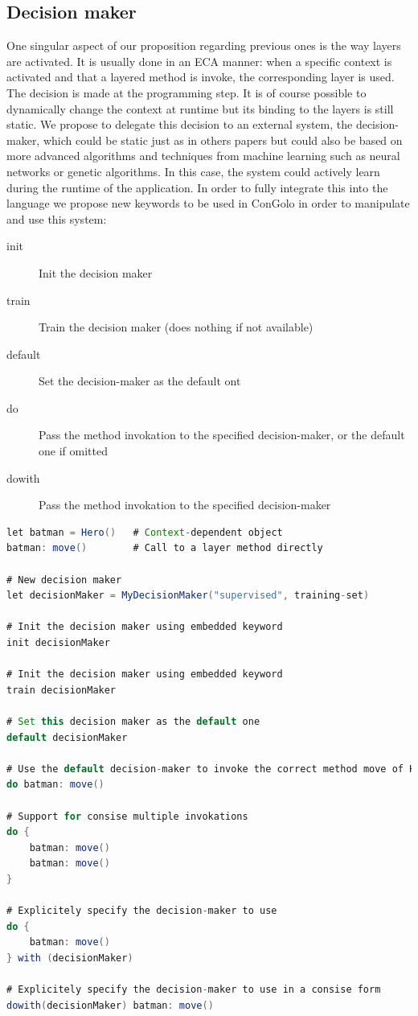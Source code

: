 \documentclass[a4paper]{article}
\begin{document}
\subsection{Decision maker}
\label{subsection:decisionmaker}

One singular aspect of our proposition regarding previous ones is the way layers are activated. It is usually done in an ECA manner: when a specific context is activated and that a layered method is invoke, the corresponding layer is used. The decision is made at the programming step. It is of course possible to dynamically change the context at runtime but its binding to the layers is still static. We propose to delegate this decision to an external system, the decision-maker, which could be static just as in others papers but could also be based on more advanced algorithms and techniques from machine learning such as neural networks or genetic algorithms. In this case, the system could actively learn during the runtime of the application. In order to fully integrate this into the language we propose new keywords to be used in ConGolo in order to manipulate and use this system:

\begin{description}
  \item[init] Init the decision maker
  \item[train] Train the decision maker (does nothing if not available)
  \item[default] Set the decision-maker as the default ont
  \item[do] Pass the method invokation to the specified decision-maker, or the default one if omitted
  \item[dowith] Pass the method invokation to the specified decision-maker
\end{description}

\begin{lstlisting}[float, language=Java, caption=ConGolo example, label={listing:congolohero}]
let batman = Hero()   # Context-dependent object
batman: move()        # Call to a layer method directly

# New decision maker
let decisionMaker = MyDecisionMaker("supervised", training-set) 

# Init the decision maker using embedded keyword
init decisionMaker    

# Init the decision maker using embedded keyword
train decisionMaker   

# Set this decision maker as the default one
default decisionMaker 

# Use the default decision-maker to invoke the correct method move of Hero
do batman: move()	

# Support for consise multiple invokations
do {
	batman: move()
	batman: move()
}

# Explicitely specify the decision-maker to use
do {
	batman: move()
} with (decisionMaker) 

# Explicitely specify the decision-maker to use in a consise form
dowith(decisionMaker) batman: move()	
\end{lstlisting}
\end{document}
